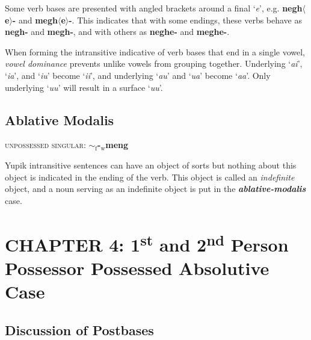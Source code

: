 \documentclass{article}
\begin{document}
\vspace{12pt}

Some verb bases are presented with angled brackets around a final `\textit{e}', e.g. \textbf{negh$\langle$e$\rangle$-} and \textbf{megh$\langle$e$\rangle$-}.
%
This indicates that with some endings, these verbs behave as \textbf{negh-} and \textbf{megh-}, and with others as \textbf{neghe-} and \textbf{meghe-}.

\vspace{12pt}

When forming the intransitive indicative of verb bases that end in a single vowel, \textit{vowel dominance} prevents unlike vowels from grouping together.
%
Underlying `\textit{ai}', `\textit{ia}', and `\textit{iu}' become `\textit{ii}', and underlying `\textit{au}' and `\textit{ua}' become `\textit{aa}'.
%
Only underlying `\textit{uu}' will result in a surface `\textit{uu}'.

\subsection{Ablative Modalis}

\textsc{unpossessed singular}: \textbf{$\sim_\text{f}$-$_\text{w}$meng}

\vspace{12pt}

Yupik intransitive sentences can have an object of sorts but nothing about this object is indicated in the ending of the verb.
%
This object is called an \textit{indefinite} object, and a noun serving as an indefinite object is put in the \textit{\textbf{ablative-modalis}} case.


\section{CHAPTER 4: 1\textsuperscript{st} and 2\textsuperscript{nd} Person Possessor Possessed Absolutive Case}

\subsection{Discussion of Postbases}
\end{document}
